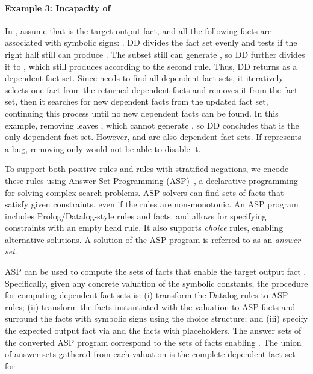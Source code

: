 \paragraph*{\textbf{Example 3: Incapacity of \Symlog}} 
In ,
assume that \code{\relation{=}} is the target output fact, and all the following facts are associated with symbolic signs: .
DD divides the fact set evenly and tests if the right half still can produce \code{\relation}.
The subset  still can generate \code{\relation}, so DD further divides it to , which still produces \code{\relation} according to the second rule. 
Thus, DD returns  as a dependent fact set. 
Since \Symlog needs to find all dependent fact sets, it iteratively selects one fact from the returned dependent facts and removes it from the fact set, then it searches for new dependent facts from the updated fact set, continuing this process until no new dependent facts can be found.
In this example, removing  leaves \code{\{}\code{\}}, which cannot generate \code{\relation}, so DD 
concludes that \code{\{}\code{\}} is the only dependent fact set.
However, \code{\{}\code{\}} and \code{\{}\code{\}} are also dependent fact sets. 
If \code{\relation} represents a bug, removing only  would not be able to disable it. 




To support both positive rules and rules with stratified negations,  
we encode these  %
rules using Answer Set Programming (ASP)~\cite{DBLP:books/sp/Lifschitz19}, a declarative programming for solving complex search problems.
ASP solvers can find sets of facts that satisfy given constraints, even if the rules are non-monotonic. 
An ASP program includes Prolog/Datalog-style rules and facts, and allows for specifying constraints with an empty head rule. 
It also supports \emph{choice} rules, enabling alternative solutions. 
A solution of the ASP program is referred to as an \emph{answer set}.

ASP can be used to compute the sets of facts that enable the target output fact \code{\relation}.
Specifically, given any concrete valuation of the symbolic constants, the procedure for computing dependent fact sets is: 
(i) transform the Datalog rules to ASP rules;
(ii) transform the facts instantiated with the valuation to ASP facts and surround the facts with symbolic signs using the choice structure; and
(iii) specify the expected output fact via \code{\relation} and the facts with placeholders.
The answer sets of the converted ASP program correspond to the sets of facts enabling \code{\relation}.
The union of answer sets gathered from each valuation is the complete dependent fact set for \code{\relation}. 


